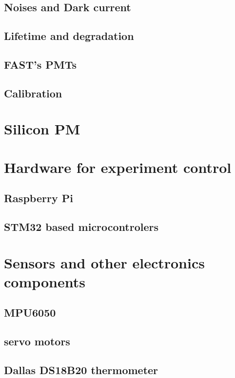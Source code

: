 \subsection{Noises and Dark current}

\subsection{Lifetime and degradation}

\subsection{FAST's PMTs}

\subsection{Calibration}


\section{Silicon PM}


\section{Hardware for experiment control}
\subsection{Raspberry Pi}

\subsection{STM32 based microcontrolers}

\section{Sensors and other electronics components}

\subsection{MPU6050}

\subsection{servo motors}

\subsection{Dallas DS18B20 thermometer}
